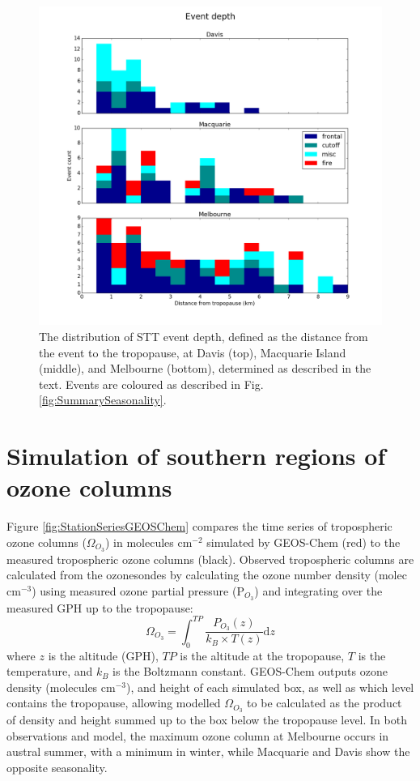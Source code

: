 \documentclass[acp, manuscript]{copernicus} %
\begin{document}
  \begin{figure}[t]
    \includegraphics[width=12cm]{figures/summary_depth.png}
    \caption{The distribution of STT event depth, defined as the distance from the event to the tropopause, at Davis (top), Macquarie Island (middle), and Melbourne (bottom), determined as described in the text.
    Events are coloured as described in Fig. \ref{fig:SummarySeasonality}.}
    \label{fig:SummaryTPDepths}    
  \end{figure}

\section{Simulation of southern regions of ozone columns}
  
  Figure \ref{fig:StationSeriesGEOSChem} compares the time series of tropospheric ozone columns ($\Omega_{O_3}$) in molecules cm$^{-2}$ simulated by GEOS-Chem (red) to the measured tropospheric ozone columns (black).
  Observed tropospheric columns are calculated from the ozonesondes by calculating the ozone number density (molec cm$^{-3}$) using measured ozone partial pressure (P$_{O_3}$) and integrating over the measured GPH up to the tropopause:
  \begin{equation}
    \Omega_{O_3} = \int_{0}^{TP} \frac{P_{O_3}(z)}{k_B \times T(z)} \mathrm{d}z
  \end{equation}
  where $z$ is the altitude (GPH), $TP$ is the altitude at the tropopause, $T$ is the temperature, and $k_B$ is the Boltzmann constant.
  GEOS-Chem outputs ozone density (molecules cm$^{-3}$), and height of each simulated box, as well as which level contains the tropopause, allowing modelled $\Omega_{O_3}$ to be calculated as the product of density and height summed up to the box below the tropopause level.
  In both observations and model, the maximum ozone column at Melbourne occurs in austral summer, with a minimum in winter, while Macquarie and Davis show the opposite seasonality.
  
\end{document}
